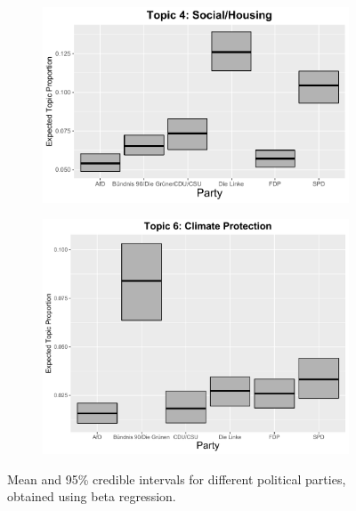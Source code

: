 \begin{figure}[h!]
  \centering
  \begin{subfigure}[b]{0.4\linewidth}
    \includegraphics[width=\linewidth]{../plots/appendix/5_1/beta_t4_cat.pdf}
  \end{subfigure}
  \begin{subfigure}[b]{0.4\linewidth}
    \includegraphics[width=\linewidth]{../plots/appendix/5_1/beta_t6_cat.pdf}
  \end{subfigure}
  \caption{Mean and 95\% credible intervals for different political parties, obtained using beta regression.}
  \label{fig:coffee}
\end{figure}

